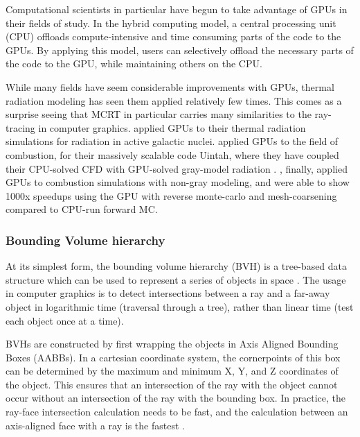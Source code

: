 Computational scientists in particular have begun to take advantage of GPUs in their fields of study. In the hybrid computing model, a central processing unit (CPU) offloads compute-intensive and time consuming parts of the code to the GPUs.
By applying this model, users can selectively offload the necessary parts of the code to the GPU, while maintaining others on the CPU.

While many fields have seem considerable improvements with GPUs, thermal radiation modeling has seen them applied relatively few times. This comes as a surprise seeing that MCRT in particular carries many similarities to the ray-tracing in computer graphics.
\citet{Heymann2012GPU-basedAGN} applied GPUs to their thermal radiation simulations for radiation in active galactic nuclei.
\citet{Humphrey2012RadiationSystem} applied GPUs to the field of combustion, for their massively scalable code Uintah, where they have coupled their CPU-solved CFD with GPU-solved gray-model radiation \cite{Humphrey2015ATracingb,Humphrey2016RadiativeRefinement,Holmen2017ImprovingTasks,Peterson2018DemonstratingComputations}. 
\citet{Silvestri2019ASimulation}, finally, applied GPUs to combustion simulations with non-gray modeling, and were able to show 1000x speedups using the GPU with reverse monte-carlo and mesh-coarsening compared to CPU-run forward MC.

\subsubsection{Bounding Volume hierarchy}
At its simplest form, the bounding volume hierarchy (BVH) is a tree-based data structure which can be used to represent a series of objects in space \cite{Shirley2020RayWeek,Meister2021ATracing}. The usage in computer graphics is to detect intersections between a ray and a far-away object in logarithmic time (traversal through a tree), rather than linear time (test each object once at a time).

BVHs are constructed by first wrapping the objects in Axis Aligned Bounding Boxes (AABBs). In a cartesian coordinate system, the cornerpoints of this box can be determined by the maximum and minimum X, Y, and Z coordinates of the object.
This ensures that an intersection of the ray with the object cannot occur without an intersection of the ray with the bounding box. 
In practice, the ray-face intersection calculation needs to be fast, and the calculation between an axis-aligned face with a ray is the fastest \cite{Kay1986RayScenes}.

